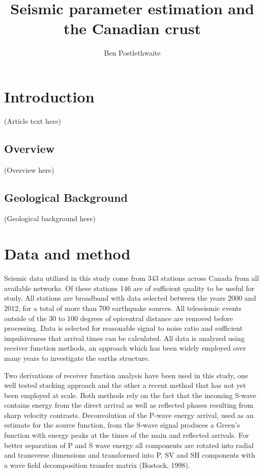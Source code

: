 \documentclass[draft, 12pt]{article}
\title{Seismic parameter estimation and the Canadian crust}
\author{Ben Postlethwaite}
\begin{document}
\begin{abstract}
\end{abstract}


\section{Introduction}
(Article text here)
\subsection{Overview}
(Overview here)
\subsection{Geological Background}
(Geological background here)

\section{Data and method}
   Seismic data utilized in this study come from 343 stations across Canada from all available networks. Of these stations 146 are of sufficient quality to be useful for study. All stations are broadband with data selected between the years 2000 and 2012, for a total of more than 700 earthquake sources. All teleseismic events outside of the 30 to 100 degrees of epicentral distance are removed before processing. Data is selected for reasonable signal to noise ratio and sufficient impulsiveness that arrival times can be calculated. All data is analyzed using receiver function methods, an approach which has been widely employed over many years to investigate the earths structure.

   Two derivations of receiver function analysis have been used in this study, one well tested stacking approach and the other a recent method that has not yet been employed at scale. Both methods rely on the fact that the incoming S-wave contains energy from the direct arrival as well as reflected phases resulting from sharp velocity contrasts. Deconvolution of the P-wave energy arrival, used as an estimate for the source function, from the S-wave signal produces a Green's function with energy peaks at the times of the main and reflected arrivals. For better separation of P and S wave energy all components are rotated into radial and transverse dimensions and transformed into P, SV and SH components with a wave field decomposition transfer matrix (Bostock, 1998).
\end{document}
